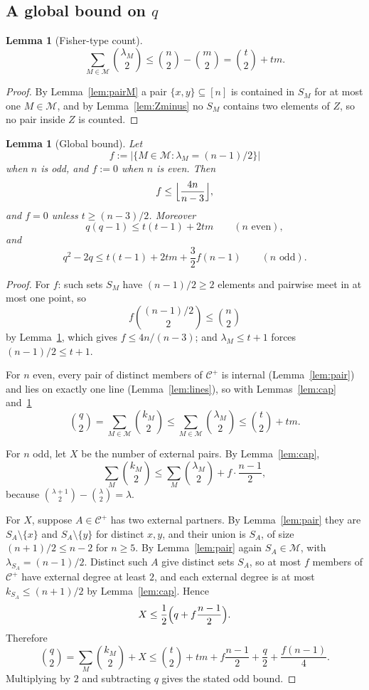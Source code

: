 \documentclass[11pt,a4paper]{amsart}
\theoremstyle{plain}
\newtheorem{lemma}[theorem]{Lemma}
\theoremstyle{definition}
\newcommand{\Cc}{\mathcal{C}}
\newcommand{\Mm}{\mathcal{M}}
\newcommand{\Cp}{\Cc^{+}}
\begin{document}
\subsection*{A global bound on \texorpdfstring{$q$}{q}}

\begin{lemma}[Fisher-type count]\label{lem:fisher}
\[
  \sum_{M\in\Mm}\binom{\lambda_M}{2}
  \le
  \binom n2-\binom m2
  =
  \binom t2+tm.
\]
\end{lemma}

\begin{proof}
By Lemma~\ref{lem:pairM} a pair $\{x,y\}\subseteq[n]$ is contained in $S_M$ for
at most one $M\in\Mm$, and by Lemma~\ref{lem:Zminus} no $S_M$ contains two
elements of $Z$, so no pair inside $Z$ is counted.
\end{proof}

\begin{lemma}[Global bound]\label{lem:q}
Let
\[
  f:=|\{M\in\Mm:\lambda_M=(n-1)/2\}|
\]
when $n$ is odd, and $f:=0$ when $n$ is even. Then
\[
  f\le\Bigl\lfloor\frac{4n}{n-3}\Bigr\rfloor,
\]
and $f=0$ unless $t\ge(n-3)/2$. Moreover
\[
  q(q-1)\le t(t-1)+2tm
  \qquad(n\text{ even}),
\]
and
\[
  q^2-2q\le t(t-1)+2tm+\frac32 f(n-1)
  \qquad(n\text{ odd}).
\]
\end{lemma}

\begin{proof}
For $f$: such sets $S_M$ have $(n-1)/2\ge2$ elements and pairwise meet in at
most one point, so
\[
  f\binom{(n-1)/2}{2}\le\binom n2
\]
by Lemma~\ref{lem:fisher}, which gives $f\le4n/(n-3)$; and
$\lambda_M\le t+1$ forces $(n-1)/2\le t+1$.

For $n$ even, every pair of distinct members of $\Cp$ is internal
(Lemma~\ref{lem:pair}) and lies on exactly one line (Lemma~\ref{lem:lines}), so
with Lemmas~\ref{lem:cap} and~\ref{lem:fisher}
\[
  \binom q2
  =
  \sum_{M\in\Mm}\binom{k_M}{2}
  \le
  \sum_{M\in\Mm}\binom{\lambda_M}{2}
  \le
  \binom t2+tm.
\]

For $n$ odd, let $X$ be the number of external pairs. By Lemma~\ref{lem:cap},
\[
  \sum_M\binom{k_M}{2}
  \le
  \sum_M\binom{\lambda_M}{2}+f\cdot\frac{n-1}{2},
\]
because $\binom{\lambda+1}{2}-\binom{\lambda}{2}=\lambda$.

For $X$, suppose $A\in\Cp$ has two external partners. By Lemma~\ref{lem:pair}
they are $S_A\setminus\{x\}$ and $S_A\setminus\{y\}$ for distinct $x,y$, and
their union is $S_A$, of size $(n+1)/2\le n-2$ for $n\ge5$. By
Lemma~\ref{lem:pair} again $S_A\in\Mm$, with $\lambda_{S_A}=(n-1)/2$. Distinct
such $A$ give distinct sets $S_A$, so at most $f$ members of $\Cp$ have external
degree at least $2$, and each external degree is at most
$k_{S_A}\le(n+1)/2$ by Lemma~\ref{lem:cap}. Hence
\[
  X\le\frac12\Bigl(q+f\frac{n-1}{2}\Bigr).
\]
Therefore
\[
  \binom q2
  =
  \sum_M\binom{k_M}{2}+X
  \le
  \binom t2+tm+f\frac{n-1}{2}+\frac q2+\frac{f(n-1)}4.
\]
Multiplying by $2$ and subtracting $q$ gives the stated odd bound.
\end{proof}
\end{document}
